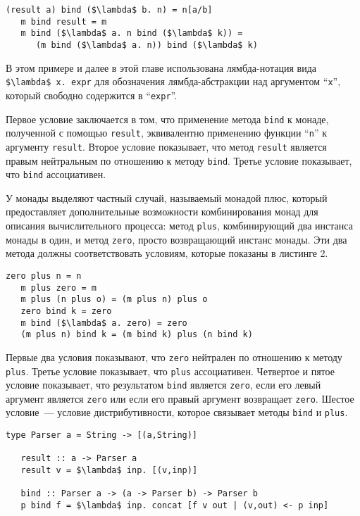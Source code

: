 \begin{lstlisting}[basicstyle=\small, caption=Законы монады]
   (result a) bind ($\lambda$ b. n) = n[a/b]
   m bind result = m
   m bind ($\lambda$ a. n bind ($\lambda$ k)) =
      (m bind ($\lambda$ a. n)) bind ($\lambda$ k)
\end{lstlisting}

В этом примере и далее в этой главе использована лямбда-нотация вида \lstinline|$\lambda$ x. expr| для обозначения лямбда-абстракции над аргументом ``\lstinline|x|'', который свободно содержится в ``\lstinline|expr|''.

Первое условие заключается в том, что применение метода \lstinline|bind| к монаде, полученной с помощью \lstinline|result|, эквивалентно применению функции ``\lstinline|n|'' к аргументу \lstinline|result|. Второе условие показывает, что метод \lstinline|result| является правым нейтральным по отношению к методу \lstinline|bind|. Третье условие показывает, что \lstinline|bind| ассоциативен.

У монады выделяют частный случай, называемый монадой плюс, который предоставляет дополнительные возможности комбинирования монад для описания вычислительного процесса: метод \lstinline|plus|, комбинирующий два инстанса монады в один, и метод \lstinline|zero|, просто возвращающий инстанс монады. Эти два метода должны соответствовать условиям, которые показаны в листинге 2.

\begin{lstlisting}[basicstyle=\small, caption=Законы монады плюс]
   zero plus n = n
   m plus zero = m
   m plus (n plus o) = (m plus n) plus o
   zero bind k = zero
   m bind ($\lambda$ a. zero) = zero
   (m plus n) bind k = (m bind k) plus (n bind k)
\end{lstlisting}

Первые два условия показывают, что \lstinline|zero| нейтрален по отношению к методу \lstinline|plus|.
Третье условие показывает, что \lstinline|plus| ассоциативен.
Четвертое и пятое условие показывает, что результатом \lstinline|bind| является \lstinline|zero|, если его левый аргумент является \lstinline|zero| или если его правый аргумент возвращает \lstinline|zero|.
Шестое условие~--- условие дистрибутивности, которое связывает методы \lstinline|bind| и \lstinline|plus|.

\begin{lstlisting}[basicstyle=\small, caption=Парсеры как монады]
   type Parser a = String -> [(a,String)]

   result :: a -> Parser a
   result v = $\lambda$ inp. [(v,inp)]

   bind :: Parser a -> (a -> Parser b) -> Parser b
   p bind f = $\lambda$ inp. concat [f v out | (v,out) <- p inp]
\end{lstlisting}

